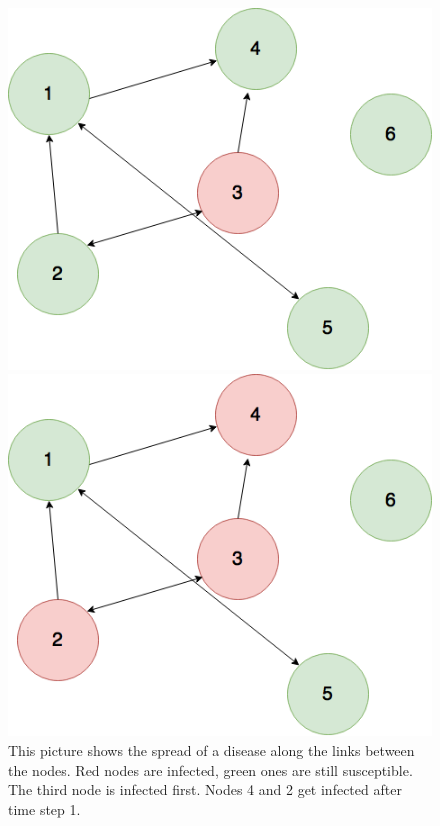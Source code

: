 \begin{figure}[htbp]

\begin{minipage}{0.5\textwidth}
\centering
\noindent\includegraphics[width=0.9\linewidth,height=\textheight,
keepaspectratio]{Graph2.png} 
\end{minipage}
\begin{minipage}{0.5\textwidth}
\centering
\noindent\includegraphics[width=0.9\linewidth,height=\textheight,
keepaspectratio]{Graph3.png} 
\end{minipage}
\caption[Infection Spread On A Static Network]{This picture shows the spread of a disease along the links between the nodes. Red nodes are infected, green ones are still susceptible. The third node is infected first. Nodes 4 and 2 get infected after time step 1.}
\label{fig:disSpreadExampl}
\end{figure}

